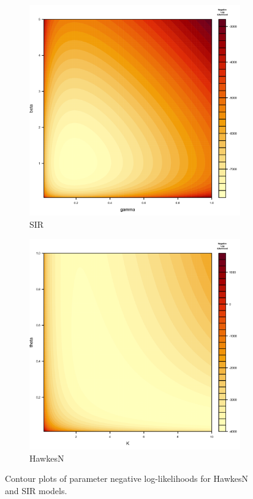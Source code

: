 \documentclass[12pt]{article}
\begin{document}
\begin{figure}
\centering
\begin{subfigure}{.5\textwidth}
  \centering
  \includegraphics[width=1\linewidth]{../figures/SIR_contour-plot_gamma_beta.png}
  \caption{SIR}
\end{subfigure}%
\begin{subfigure}{.5\textwidth}
  \centering
  \includegraphics[width=1\linewidth]{../figures/HawkesN_contour-plot_K_theta.png}
  \caption{HawkesN}
\end{subfigure}
\caption{Contour plots of parameter negative log-likelihoods for HawkesN and SIR models. }\label{fig:contour}
\end{figure}
\end{document}
